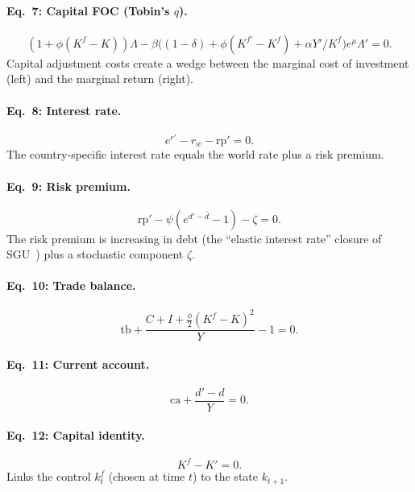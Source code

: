 \documentclass[11pt,a4paper]{article}
\theoremstyle{definition}
\begin{document}
	\paragraph{Eq.~7: Capital FOC (Tobin's $q$).}
	\begin{equation}\label{eq:sgu_capital}
		(1 + \phi(K^f - K))\Lambda - \beta\bigl((1-\delta) + \phi(K^{f\prime} - K^f) + \alpha Y'/K^f\bigr) e^{\mu} \Lambda' = 0.
	\end{equation}
	Capital adjustment costs create a wedge between the marginal cost of investment (left) and the marginal return (right).

	\paragraph{Eq.~8: Interest rate.}
	\begin{equation}\label{eq:sgu_ir}
		e^{r'} - r_w - \text{rp}' = 0.
	\end{equation}
	The country-specific interest rate equals the world rate plus a risk premium.

	\paragraph{Eq.~9: Risk premium.}
	\begin{equation}\label{eq:sgu_rp}
		\text{rp}' - \psi(e^{d' - \bar{d}} - 1) - \zeta = 0.
	\end{equation}
	The risk premium is increasing in debt (the ``elastic interest rate'' closure of SGU~\cite{sgu2003}) plus a stochastic component $\zeta$.

	\paragraph{Eq.~10: Trade balance.}
	\begin{equation}\label{eq:sgu_tb}
		\text{tb} + \frac{C + I + \frac{\phi}{2}(K^f - K)^2}{Y} - 1 = 0.
	\end{equation}

	\paragraph{Eq.~11: Current account.}
	\begin{equation}\label{eq:sgu_ca}
		\text{ca} + \frac{d' - d}{Y} = 0.
	\end{equation}

	\paragraph{Eq.~12: Capital identity.}
	\begin{equation}\label{eq:sgu_kid}
		K^f - K' = 0.
	\end{equation}
	Links the control $k^f_t$ (chosen at time $t$) to the state $k_{t+1}$.
\end{document}
